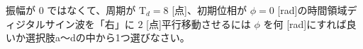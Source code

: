 振幅が $0$ ではなくて、周期が $\textrm{T}_d = 8$ [点]、初期位相が $\phi = 0$ [rad]の時間領域ディジタルサイン波を「右」に $2$ [点]平行移動させるには $\phi$ を何 [rad]にすれば良いか選択肢a〜dの中から1つ選びなさい。
